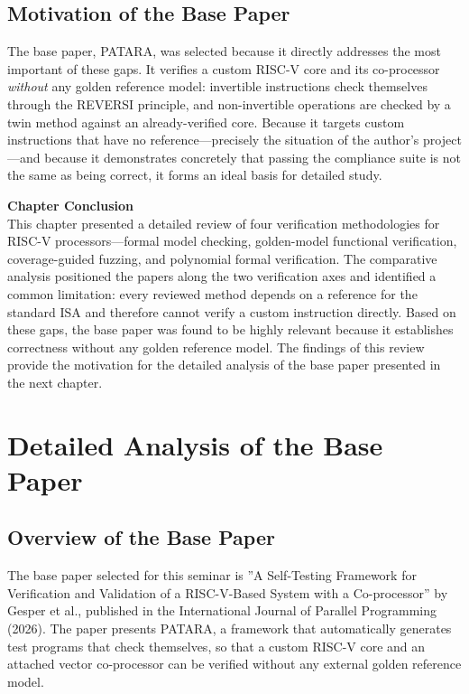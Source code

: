 \documentclass[12pt,a4paper]{report}
\begin{document}
\section{Motivation of the Base Paper}
The base paper, PATARA, was selected because it directly addresses the most important of
these gaps. It verifies a custom RISC-V core and its co-processor \emph{without} any golden
reference model: invertible instructions check themselves through the REVERSI principle,
and non-invertible operations are checked by a twin method against an already-verified core.
Because it targets custom instructions that have no reference---precisely the situation of
the author's project---and because it demonstrates concretely that passing the compliance
suite is not the same as being correct, it forms an ideal basis for detailed study.

\vspace{0.3cm}
\noindent\textbf{Chapter Conclusion}\\[2pt]
This chapter presented a detailed review of four verification methodologies for RISC-V
processors---formal model checking, golden-model functional verification, coverage-guided
fuzzing, and polynomial formal verification. The comparative analysis positioned the papers
along the two verification axes and identified a common limitation: every reviewed method
depends on a reference for the standard ISA and therefore cannot verify a custom instruction
directly. Based on these gaps, the base paper was found to be highly relevant because it
establishes correctness without any golden reference model. The findings of this review
provide the motivation for the detailed analysis of the base paper presented in the next
chapter.

\chapter{Detailed Analysis of the Base Paper}

\section{Overview of the Base Paper}
The base paper selected for this seminar is ''A Self-Testing Framework for Verification and
Validation of a RISC-V-Based System with a Co-processor'' by Gesper et al., published in the
International Journal of Parallel Programming (2026). The paper presents PATARA, a framework
that automatically generates test programs that check themselves, so that a custom RISC-V
core and an attached vector co-processor can be verified without any external golden
reference model.
\end{document}

